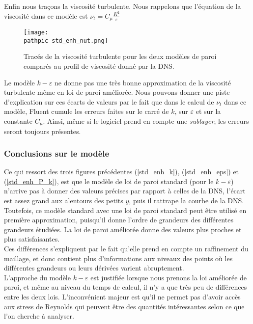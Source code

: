 \documentclass[a4paper,10pt]{article}
\newcommand\pathpic{/home/saura/Documents/Latex_files/Pic/}
\newcommand{\keps}{$k-\varepsilon$}
\newcommand{\dgreen}{\color{dgreen}}
\newcommand\black{\color{black}}
\begin{document}
Enfin nous traçons la viscosité turbulente. Nous rappelons que l'équation de la viscosité dans ce modèle est $\nu_t = C_\mu \frac{K^2}{\varepsilon} $

\begin{figure}[ht!]
\centering
\texttt{[image: \\pathpic std\_enh\_nut.png]}
\caption{Tracés de la viscosité turbulente pour les deux modèles de paroi comparés au profil de viscosité donné par la DNS.}
\label{}
\end{figure}
Le modèle \keps $ $ ne donne pas une très bonne approximation de la viscosité turbulente même en loi de paroi améliorée. Nous pouvons donner une piste d'explication sur ces écarts de valeurs par le fait que dans le calcul de $\nu_t$ dans ce modèle, Fluent cumule les erreurs faites sur le carré de $k$, sur $\varepsilon$ et sur la constante $C_\mu$. Ainsi, même si le logiciel prend en compte une \textit{sublayer}, les erreurs seront toujours présentes.

\pagebreak

\dgreen \subsubsection*{Conclusions sur le modèle } \black
Ce qui ressort des trois figures précédentes (\ref{std_enh_k}), (\ref{std_enh_eps}) et (\ref{std_enh_P_k}), est que le modèle de loi de paroi standard (pour le \keps) n'arrive pas à donner des valeurs précises par rapport à celles de la DNS, l'écart est assez grand aux alentours des petits $y$, puis il rattrape la courbe de la DNS. Toutefois, ce modèle standard avec une loi de paroi standard peut être utilisé en première approximation, puisqu'il donne l'ordre de grandeurs des différentes grandeurs étudiées. La loi de paroi améliorée donne des valeurs plus proches et plus satisfaisantes. \\
Ces différences s'expliquent par le fait qu'elle prend en compte un raffinement du maillage, et donc contient plus d'informations aux niveaux des points où les différentes grandeurs ou leurs dérivées varient abruptement. \\

L'approche du modèle \keps $ $ est justifiée lorsque nous prenons la loi améliorée de paroi, et même au niveau du temps de calcul, il n'y a que très peu de différences entre les deux lois. L'inconvénient majeur est qu'il ne permet pas d'avoir accès aux stress de Reynolds qui peuvent être des quantités intéressantes selon ce que l'on cherche à analyser. 
\end{document}
